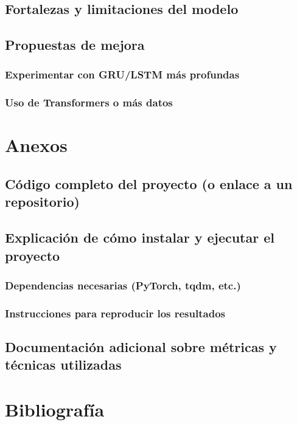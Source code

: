 \documentclass{article}
\begin{document}
\subsection{Fortalezas y limitaciones del modelo}
\subsection{Propuestas de mejora}
\subsubsection{Experimentar con GRU/LSTM más profundas}
\subsubsection{Uso de Transformers o más datos}

\section{Anexos}
\subsection{Código completo del proyecto (o enlace a un repositorio)}
\subsection{Explicación de cómo instalar y ejecutar el proyecto}
\subsubsection{Dependencias necesarias (PyTorch, tqdm, etc.)}
\subsubsection{Instrucciones para reproducir los resultados}
\subsection{Documentación adicional sobre métricas y técnicas utilizadas}

\newpage

\section{Bibliografía}
\nocite{*}
\printbibliography
\end{document}
